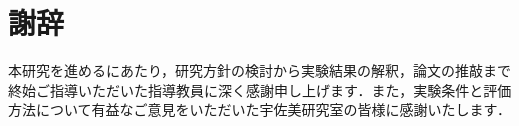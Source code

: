\chapter*{謝辞}

\UsamiFictionalExampleNotice
\par\vspace{1.5\baselineskip}

本研究を進めるにあたり，研究方針の検討から実験結果の解釈，論文の推敲まで終始ご指導いただいた指導教員に深く感謝申し上げます．また，実験条件と評価方法について有益なご意見をいただいた宇佐美研究室の皆様に感謝いたします．
